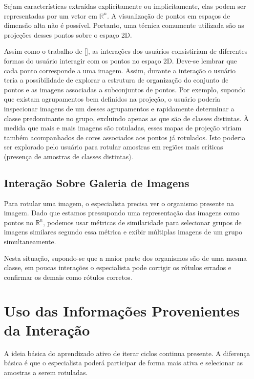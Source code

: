 Sejam características extraídas explicitamente ou implicitamente, elas podem ser representadas por um vetor em $\mathbb{R}^n$. A visualização de pontos em espaços de dimensão alta não é possível. Portanto, uma técnica comumente utilizada são as projeções desses pontos sobre o espaço 2D.  

Assim como o trabalho de [\cite{bernard2018comparing}], as interações dos usuários consistiriam de diferentes formas do usuário interagir com os pontos no espaço 2D.  Deve-se lembrar que cada ponto corresponde a uma imagem. Assim, durante a interação o usuário teria a possibilidade de explorar a estrutura de organização do conjunto de pontos e as imagens associadas a subconjuntos de pontos. Por exemplo, supondo que existam agrupamentos bem definidos na projeção, o usuário poderia inspecionar imagens de um desses agrupamentos e rapidamente determinar a classe predominante no grupo, excluindo apenas as que são de classes distintas. À medida que mais e mais imagens são rotuladas, esses mapas de projeção viriam também acompanhados de cores associados aos pontos já rotulados. Isto poderia ser explorado pelo usuário para rotular amostras em regiões mais críticas (presença de amostras de classes distintas).




\subsection{Interação Sobre Galeria de Imagens} 
\label{sec:galeria_imagens}

Para rotular uma imagem, o especialista precisa ver o organismo presente na imagem. Dado que estamos pressupondo uma representação  das imagens como pontos no $\mathbb{R}^n$, podemos usar métricas de similaridade para selecionar grupos de imagens similares segundo essa métrica e exibir múltiplas imagens de um grupo simultaneamente.
 
Nesta situação, supondo-se que a maior parte dos organismos são de uma mesma classe, em poucas interações o especialista pode corrigir os rótulos errados e confirmar os demais como rótulos corretos. 


\section{Uso das Informações Provenientes da Interação}
\label{sec:uso_das_informacoes_interacao}

A ideia básica do aprendizado ativo de iterar ciclos continua presente. A diferença básica é que o especialista poderá participar de forma mais ativa e selecionar as amostras a serem rotuladas.

